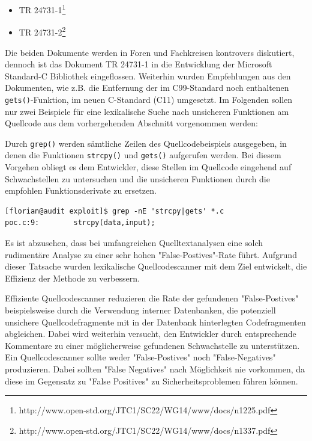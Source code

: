 \begin{itemize}
      \item TR 24731-1\footnote{http://www.open-std.org/JTC1/SC22/WG14/www/docs/n1225.pdf}    
      \item TR 24731-2\footnote{http://www.open-std.org/JTC1/SC22/WG14/www/docs/n1337.pdf}
\end{itemize}
	
Die beiden Dokumente werden in Foren und Fachkreisen kontrovers 
diskutiert, dennoch ist das Dokument TR 24731-1 in die Entwicklung 
der Microsoft Standard-C Bibliothek eingeflossen. Weiterhin wurden 
Empfehlungen aus den Dokumenten, wie z.B. die Entfernung der im 
C99-Standard noch enthaltenen \texttt{gets()}-Funktion, im neuen 
C-Standard (C11) umgesetzt.
Im Folgenden sollen nur zwei Beispiele für eine lexikalische Suche 
nach unsicheren Funktionen am Quellcode aus dem vorhergehenden 
Abschnitt vorgenommen werden:
\par\medskip 
Durch \texttt{grep()} werden sämtliche Zeilen des Quellcodebeispiels 
ausgegeben, in denen die Funktionen \texttt{strcpy()} und \texttt{gets()} 
aufgerufen werden. Bei diesem Vorgehen obliegt es dem Entwickler, diese 
Stellen im Quellcode eingehend auf Schwachstellen zu untersuchen und 
die unsicheren Funktionen durch die empfohlen Funktionsderivate zu 
ersetzen.

\begin{lstlisting}[basicstyle=\ttfamily\footnotesize]
[florian@audit exploit]$ grep -nE 'strcpy|gets' *.c
poc.c:9:        strcpy(data,input);
\end{lstlisting}

Es ist abzusehen, dass bei umfangreichen Quelltextanalysen eine solch 
rudimentäre Analyse zu einer sehr hohen "False-Postives"-Rate führt. 
Aufgrund dieser Tatsache wurden lexikalische Quellcodescanner mit dem 
Ziel entwickelt, die Effizienz der Methode zu verbessern.

Effiziente Quellcodescanner reduzieren die Rate der gefundenen 
"False-Postives" beispielsweise durch die Verwendung interner 
Datenbanken, die  potenziell unsichere Quellcodefragmente mit in 
der Datenbank hinterlegten Codefragmenten abgleichen. Dabei wird 
weiterhin versucht, den Entwickler durch entsprechende Kommentare zu 
einer möglicherweise gefundenen Schwachstelle zu unterstützen. Ein 
Quellcodescanner sollte weder "False-Postives" noch "False-Negatives" 
produzieren. Dabei sollten "False Negatives" nach Möglichkeit nie 
vorkommen, da diese im Gegensatz zu "False Positives" zu 
Sicherheitsproblemen führen können.

